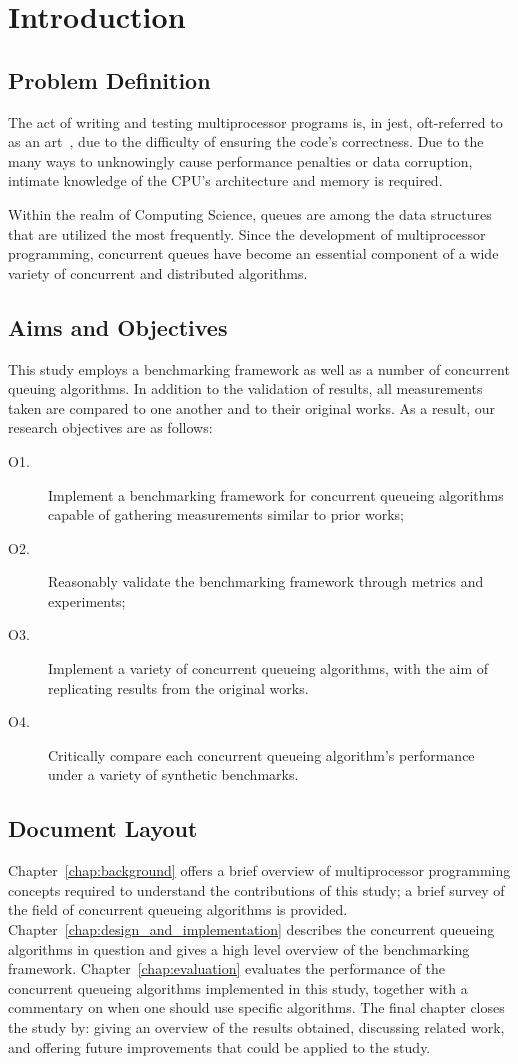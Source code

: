 \chapter{Introduction}
\section{Problem Definition}

The act of writing and testing multiprocessor programs is, in jest,
oft-referred to as an art~\citep{herlihy2020art}, due to the difficulty of
ensuring the code's correctness. 
Due to the many ways to unknowingly cause
performance penalties or data corruption, intimate knowledge of the CPU's
architecture and memory is required. 

Within the realm of Computing Science, queues are among the data structures that
are utilized the most frequently. Since the development of multiprocessor
programming, concurrent queues have become an essential component of a wide
variety of concurrent and distributed algorithms.

\section{Aims and Objectives}

This study employs a benchmarking framework as well as a number of concurrent
queuing algorithms. In addition to the validation of results, all measurements
taken are compared to one another and to their original works. As a result, our
research objectives are as follows:

\begin{description}
\item[O1.] Implement a benchmarking framework for concurrent queueing
algorithms capable of gathering measurements similar to prior works;
\item[O2.] Reasonably validate the benchmarking framework through
metrics and experiments;
\item[O3.] Implement a variety of concurrent queueing algorithms, with the aim
of replicating results from the original works.
\item[O4.] Critically compare each concurrent queueing algorithm's performance
under a variety of synthetic benchmarks.
\end{description}

\section{Document Layout}
Chapter~\ref{chap:background} offers a brief overview of multiprocessor
programming concepts required to understand the contributions of this study; a
brief survey of the field of concurrent queueing algorithms is provided.
Chapter~\ref{chap:design_and_implementation} describes the concurrent queueing
algorithms in question and gives a high level overview of the benchmarking
framework.
Chapter~\ref{chap:evaluation} evaluates the performance of the
concurrent queueing algorithms implemented in this study, together with a
commentary on when one should use specific algorithms. The final chapter closes
the study by: giving an overview of the results obtained, discussing related
work, and offering future improvements that could be applied to the study.